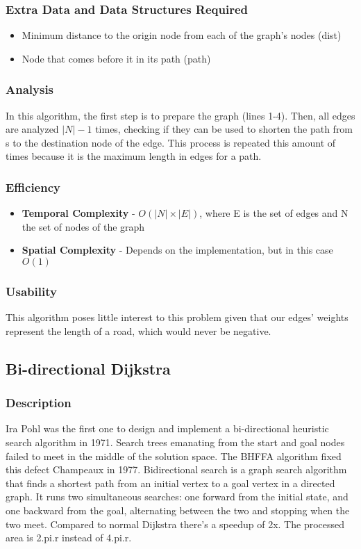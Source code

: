 \subsubsection{Extra Data and Data Structures Required}
\begin{itemize}
    \item Minimum distance to the origin node from each of the graph's nodes (dist)
    \item Node that comes before it in its path (path)
\end{itemize}



\subsubsection{Analysis}
In this algorithm, the first step is to prepare the graph (lines 1-4). Then, all edges are analyzed $|N| - 1 $ times, checking if they can be used to shorten the path from s to the destination node of the edge. This process is repeated this amount of times because it is the maximum length in edges for a path.

\subsubsection{Efficiency}
\begin{itemize}
    \item \textbf{Temporal Complexity} - $ O(|N| \times |E|) $, where E is the set of edges and N the set of nodes of the graph
    \item \textbf{Spatial Complexity} - Depends on the implementation, but in this case $ O(1) $
\end{itemize}

\subsubsection{Usability}
This algorithm poses little interest to this problem given that our edges' weights represent the length of a road, which would never be negative. 


\subsection{Bi-directional Dijkstra}

\subsubsection{Description}
Ira Pohl was the first one to design and implement a bi-directional heuristic search algorithm in 1971. Search trees emanating from the start and goal nodes failed to meet in the middle of the solution space. The BHFFA algorithm fixed this defect Champeaux in 1977. %
Bidirectional search is a graph search algorithm that finds a shortest path from an initial vertex to a goal vertex in a directed graph. It runs two simultaneous searches: one forward from the initial state, and one backward from the goal, alternating between the two and stopping when the two meet.
Compared to normal Dijkstra there's a speedup of 2x. The processed area is 2.pi.r instead of 4.pi.r. %

